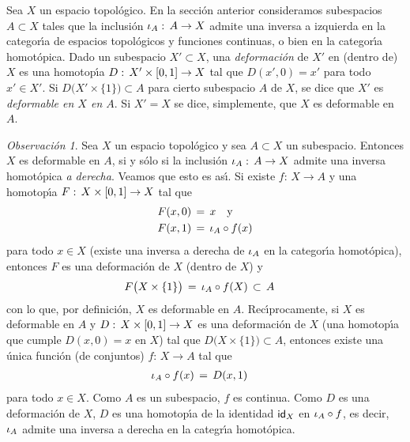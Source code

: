 \theoremstyle{plain}
\newtheorem{teoExtensionDeHomotopiasYDeformaciones}{Teorema}[section]
\newtheorem{coroExtensionDeHomotopiasRetractoEquivaleARetractoDebil}%
	[teoExtensionDeHomotopiasYDeformaciones]{Corolario}

\theoremstyle{remark}
\newtheorem{obsDeformableEquivaleATieneInversaHomotopicaADerecha}%
	{Observaci\'{o}n}[section]


Sea $X$ un espacio topol\'{o}gico. En la secci\'{o}n anterior consideramos
subespacios $A\subset X$ tales que la inclusi\'{o}n $\inc[A]:\,A\rightarrow X$
admite una inversa a izquierda en la categor\'{\i}a de espacios topol\'{o}gicos
y funciones continuas, o bien en la categor\'{\i}a homot\'{o}pica. Dado un
subespacio $X'\subset X$, una \emph{deformaci\'{o}n} de $X'$ en (dentro de)
$X$ es una homotop\'{\i}a $D:\,X'\times\intervalo\rightarrow X$ tal que
$D(x',0)=x'$ para todo $x'\in X'$. Si $D\big(X'\times\{1\}\big)\subset A$
para cierto subespacio $A$ de $X$, se dice que $X'$ es \emph{deformable en %
$X$ en $A$}. Si $X'=X$ se dice, simplemente, que $X$ es deformable en $A$.

\begin{obsDeformableEquivaleATieneInversaHomotopicaADerecha}%
	\label{obs:deformableequivaleatieneinversahomotopicaaderecha}
	Sea $X$ un espacio topol\'{o}gico y sea $A\subset X$ un subespacio.
	Entonces $X$ es deformable en $A$, si y s\'{o}lo si la inclusi\'{o}n
	$\inc[A]:\,A\rightarrow X$ admite una inversa homot\'{o}pica
	\emph{a derecha}. Veamos que esto es as\'{\i}. Si existe
	$f:\,X\rightarrow A$ y una homotop\'{\i}a
	$F:\,X\times\intervalo\rightarrow X$ tal que
	\begin{align*}
		F(x,0) & \,=\,x \quad\text{y} \\
		F(x,1) & \,=\,\inc[A]\circ f(x)
	\end{align*}
	para todo $x\in X$ (existe una inversa a derecha de $\inc[A]$ en la
	categor\'{\i}a homot\'{o}pica), entonces $F$ es una deformaci\'{o}n
	de $X$ (dentro de $X$) y
	\begin{align*}
		F\big(X\times\{1\}\big) & \,=\,\inc[A]\circ f(X) \,\subset\,A
	\end{align*}
	con lo que, por definici\'{o}n, $X$ es deformable en $A$.
	Rec\'{\i}procamente, si $X$ es deformable en $A$ y
	$D:\,X\times\intervalo\rightarrow X$ es una deformaci\'{o}n de $X$
	(una homotop\'{\i}a que cumple $D(x,0)=x$ en $X$) tal que
	$D\big(X\times\{1\}\big)\subset A$, entonces existe una \'{u}nica
	funci\'{o}n (de conjuntos) $f:\,X\rightarrow A$ tal que
	\begin{align*}
		\inc[A]\circ f(x) & \,=\,D(x,1)
	\end{align*}
	para todo $x\in X$. Como $A$ es un subespacio, $f$ es continua.
	Como $D$ es una deformaci\'{o}n de $X$, $D$ es una homotop\'{\i}a de
	la identidad $\id[X]$ en $\inc[A]\circ f$, es decir, $\inc[A]$
	admite una inversa a derecha en la categr\'{\i}a homot\'{o}pica.
\end{obsDeformableEquivaleATieneInversaHomotopicaADerecha}


